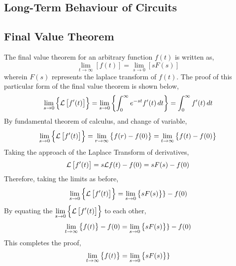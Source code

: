 \documentclass[class=report, 12pt, crop=false]{standalone}
\begin{document}
\begin{center}
\chapter{Long-Term Behaviour of Circuits}
\begin{comment}
\end{comment}
\section{Final Value Theorem}
\begin{comment}
\end{comment}
The final value theorem for an arbitrary function $f(t)$ is written as,
$$\lim_{t\to\infty}[f(t)] = \lim_{s\to0}[sF(s)]$$
wherein $F(s)$ represents the laplace transform of $f(t)$. The proof of this particular form of the final value theorem is shown below,
$$\lim_{s\to0}\left\{\mathcal{L}\left[f'(t)\right]\right\} = \lim_{s\to0}\left\{\int^{\infty}_{0}e^{-st}f'(t)\,dt\right\} = \int^{\infty}_{0}f'(t)\,dt $$
By fundamental theorem of calculus, and change of variable,
$$\lim_{s\to0}\left\{\mathcal{L}\left[f'(t)\right]\right\} = \lim_{r\to\infty}\left\{f(r) - f(0)\right\} = \lim_{t\to\infty}\left\{f(t) - f(0)\right\}$$
Taking the approach of the Laplace Transform of derivatives,
$$\mathcal{L}\left[f'(t)\right] = s\mathcal{L}{f(t)} - f(0) = sF(s) - f(0)$$
Therefore, taking the limits as before,
$$\lim_{s\to0}\left\{\mathcal{L}\left[f'(t)\right]\right\} = \lim_{s\to0}\left\{sF(s)\right\}\} - f(0)$$
By equating the $\displaystyle{\lim_{s\to0}\left\{\mathcal{L}\left[f'(t)\right]\right\}}$ to each other,
$$\lim_{t\to\infty}\left\{f(t)\right\} - f(0) = \lim_{s\to0}\left\{sF(s)\right\}\} - f(0)$$
This completes the proof,
$$\lim_{t\to\infty}\left\{f(t)\right\} = \lim_{s\to0}\left\{sF(s)\right\}\}$$

\end{center}
\end{document}
